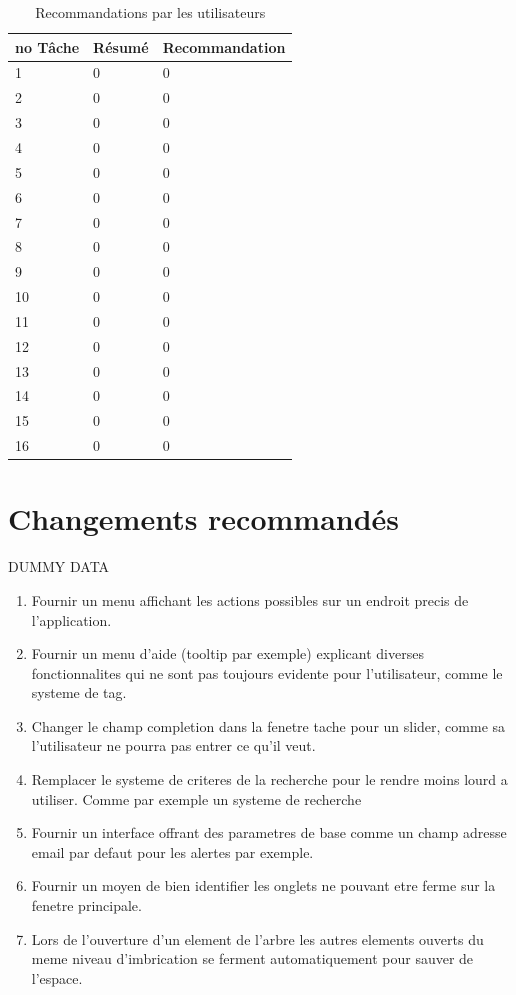 \documentclass[letterpaper, oneside, 12pt, these, creativecommons]{thETS}
\begin{document}
\begin{table}
	\centering
	\begin{tabular}{|l|l|l|}
	\hline
	no Tâche	& Résumé	& Recommandation 	\\ \hline
	1		& 0		& 0 			\\ \hline
	2		& 0		& 0 			\\ \hline
	3		& 0		& 0 			\\ \hline
	4		& 0		& 0 			\\ \hline
	5		& 0		& 0 			\\ \hline
	6		& 0		& 0 			\\ \hline
	7		& 0		& 0 			\\ \hline
	8		& 0		& 0 			\\ \hline
	9		& 0		& 0 			\\ \hline
	10		& 0		& 0 			\\ \hline
	11		& 0		& 0 			\\ \hline
	12		& 0		& 0 			\\ \hline
	13		& 0		& 0 			\\ \hline
	14		& 0		& 0 			\\ \hline
	15		& 0		& 0 			\\ \hline
	16		& 0		& 0 			\\ \hline
	\end{tabular}
	\caption{Recommandations par les utilisateurs}
\end{table}

\chapter{Changements recommandés}

DUMMY DATA

\begin{enumerate}
	\item Fournir un menu affichant les actions possibles sur un endroit precis de l'application.
	\item Fournir un menu d'aide (tooltip par exemple) explicant diverses fonctionnalites qui ne sont pas toujours evidente pour l'utilisateur, comme le systeme de tag.
	\item Changer le champ completion dans la fenetre tache pour un slider, comme sa l'utilisateur ne pourra pas entrer ce qu'il veut.
	\item Remplacer le systeme de criteres de la recherche pour le rendre moins lourd a utiliser. Comme par exemple un systeme de recherche
	\item Fournir un interface offrant des parametres de base comme un champ adresse email par defaut pour les alertes par exemple.
	\item Fournir un moyen de bien identifier les onglets ne pouvant etre ferme sur la fenetre principale.
	\item Lors de l'ouverture d'un element de l'arbre les autres elements ouverts du meme niveau d'imbrication se ferment automatiquement pour sauver de l'espace.
\end{enumerate}
\end{document}
